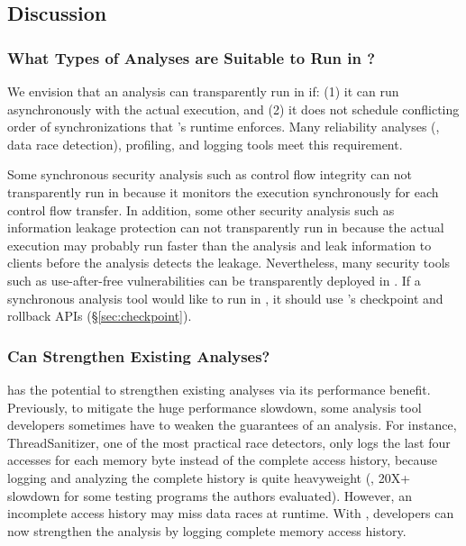 \subsection{Discussion} \label{sec:discuss}

\subsubsection{What Types of Analyses are Suitable to Run in \xxx?} 
\label{sec:analysis-types}

We envision that an analysis can transparently run in \xxx if: (1) it can run 
asynchronously with the actual execution, and (2) it does not schedule 
conflicting order of \pthread synchronizations that \xxx's \dmt runtime 
enforces. Many reliability analyses (\eg, data race detection), profiling, 
and logging tools meet this requirement.

Some synchronous security analysis such as control 
flow integrity can not transparently run in \xxx because it monitors the 
execution 
synchronously for each control flow transfer. In addition, some other security 
analysis such as information leakage protection can not transparently run in 
\xxx 
because the actual execution may probably run faster than the 
analysis and leak information to clients before the analysis detects the 
leakage. Nevertheless, many security tools such as use-after-free 
vulnerabilities can be transparently deployed in \xxx. If a synchronous 
analysis 
tool would like to run in \xxx, it should use \xxx's checkpoint 
and rollback APIs (\S\ref{sec:checkpoint}).


\subsubsection{Can \xxx Strengthen Existing Analyses?} 
\label{sec:strengthen-analysis}

\xxx has the potential to strengthen existing analyses via its performance 
benefit. Previously, to mitigate the huge performance slowdown, some analysis 
tool developers sometimes have to weaken the guarantees of an analysis. For 
instance, ThreadSanitizer\cite{tsan}, one of the most practical race detectors, 
only logs the last four accesses for each memory byte instead of the complete 
access history, because logging and analyzing the complete history is quite 
heavyweight (\eg, 20X+ slowdown for some testing programs the authors 
evaluated). However, an incomplete access history may miss data races at 
runtime. With \xxx, developers can now strengthen the analysis by logging 
complete memory access history.

